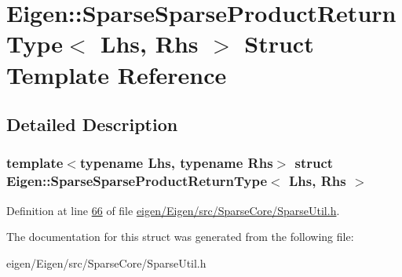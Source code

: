 \hypertarget{struct_eigen_1_1_sparse_sparse_product_return_type}{}\section{Eigen\+:\+:Sparse\+Sparse\+Product\+Return\+Type$<$ Lhs, Rhs $>$ Struct Template Reference}
\label{struct_eigen_1_1_sparse_sparse_product_return_type}


\subsection{Detailed Description}
\subsubsection*{template$<$typename Lhs, typename Rhs$>$\newline
struct Eigen\+::\+Sparse\+Sparse\+Product\+Return\+Type$<$ Lhs, Rhs $>$}



Definition at line \hyperlink{eigen_2_eigen_2src_2_sparse_core_2_sparse_util_8h_source_l00066}{66} of file \hyperlink{eigen_2_eigen_2src_2_sparse_core_2_sparse_util_8h_source}{eigen/\+Eigen/src/\+Sparse\+Core/\+Sparse\+Util.\+h}.



The documentation for this struct was generated from the following file\+:\begin{DoxyCompactItemize}
\item 
eigen/\+Eigen/src/\+Sparse\+Core/\+Sparse\+Util.\+h\end{DoxyCompactItemize}
